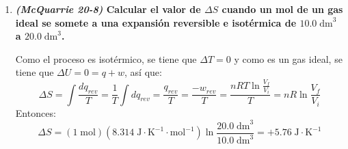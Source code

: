\documentclass[a4paper,12pt]{article}
\begin{document}
\begin{enumerate}
El camino $C$ era un calentamiento reversible a volumen constante de $P_3,V_2,T_2$ a $P_2,V_2,T_1$, as\'i que $w_{rev}=0$ y: 
$$\Delta U=q+w=q\;\rightarrow\;\Delta U=\int_{T_2}^{T_1}C_V(T)dT=q_C$$ 
Como tenemos que $dU=dq$, entonces:
$$\Delta S_C=\int\frac{dq}{T}=\int\frac{dU}{T}=\int_{T_2}^{T_1}\frac{C_V(T)dT}{T}$$

Con lo que tendr\'iamos para $B+C$:
$$q_{B+C}=q_{B}+q_{C}=0+\int_{T_2}^{T_1}C_V(T)dT$$
$$\Delta S_{B+C}=\Delta S_{B}+\Delta S_{C}=0+\int_{T_2}^{T_1}\frac{C_V(T)}{T}dT=R\ln\frac{V_2-b}{V_1-b}=\Delta S_A$$
Usando la relaci\'on entre temperaturas y vol\'umenes encontrada para el proceso adiab\'atico.

 \item \textbf{\textit{(McQuarrie 20-8)} Calcular el valor de $\Delta S$ cuando un mol de un gas ideal se somete a una expansi\'on reversible e isot\'ermica de $10.0\;\mbox{dm}^3$ a $20.0\;\mbox{dm}^3$.} %

Como el proceso es isot\'ermico, se tiene que $\Delta T=0$ y como es un gas ideal, se tiene que $\Delta U=0=q+w$, as\'i que:
$$\Delta S=\int\frac{dq_{rev}}{T}=\frac{1}{T}\int dq_{rev}=\frac{q_{rev}}{T}=\frac{-w_{rev}}{T}=\frac{nRT\ln\frac{V_f}{V_i}}{T}=nR\ln\frac{V_f}{V_i}$$
Entonces:
$$\Delta S=(1\;\mbox{mol})(8.314\;\mbox{J}\cdot\mbox{K}^{-1}\cdot\mbox{mol}^{-1})\ln\frac{20.0\;\mbox{dm}^3}{10.0\;\mbox{dm}^3}=+5.76\;\mbox{J}\cdot\mbox{K}^{-1}$$

\end{enumerate}
\end{document}
